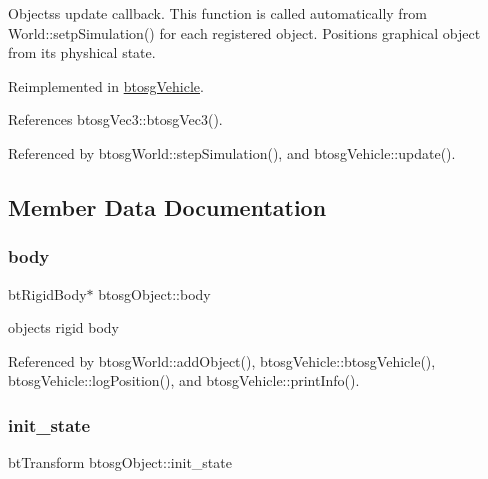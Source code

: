 Objects\textquotesingle{}s update callback. This function is called automatically from World\+::setp\+Simulation() for each registered object. Positions graphical object from its physhical state. 

Reimplemented in \hyperlink{classbtosgVehicle_a5fd0f471df492ac232c9b772a28bd2b9}{btosg\+Vehicle}.



References btosg\+Vec3\+::btosg\+Vec3().



Referenced by btosg\+World\+::step\+Simulation(), and btosg\+Vehicle\+::update().



\subsection{Member Data Documentation}
\mbox{\label{classbtosgObject_a64ccde0543c184ed1749fdb9c9699785}} 
\subsubsection{\texorpdfstring{body}{body}}
{\footnotesize\ttfamily bt\+Rigid\+Body$\ast$ btosg\+Object\+::body\hspace{0.3cm}{\ttfamily [inherited]}}



object\textquotesingle{}s rigid body 



Referenced by btosg\+World\+::add\+Object(), btosg\+Vehicle\+::btosg\+Vehicle(), btosg\+Vehicle\+::log\+Position(), and btosg\+Vehicle\+::print\+Info().

\mbox{\label{classbtosgObject_a2dee023f311114e200df9b04c8c1b400}} 
\subsubsection{\texorpdfstring{init\+\_\+state}{init\_state}}
{\footnotesize\ttfamily bt\+Transform btosg\+Object\+::init\+\_\+state\hspace{0.3cm}{\ttfamily [inherited]}}



